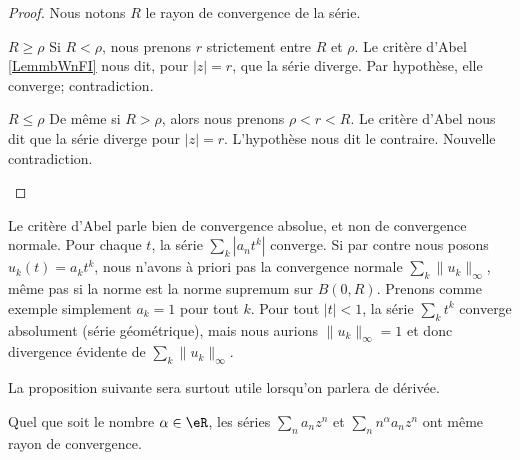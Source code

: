 \begin{proof}
	Nous notons \( R\) le rayon de convergence de la série.
	\begin{subproof}
		\item[\( R\geq \rho\)]
		Si \( R<\rho\), nous prenons \( r\) strictement entre \( R\) et \( \rho\). Le critère d'Abel \ref{LemmbWnFI} nous dit, pour \( | z |=r\), que la série diverge. Par hypothèse, elle converge; contradiction.
		\item[\( R\leq \rho\)]
		De même si \( R>\rho\), alors nous prenons \( \rho<r<R\). Le critère d'Abel nous dit que la série diverge pour \( | z |=r\). L'hypothèse nous dit le contraire. Nouvelle contradiction.
	\end{subproof}
\end{proof}

Le critère d'Abel parle bien de convergence absolue, et non de convergence normale. Pour chaque \( t\), la série \( \sum_k | a_nt^k |\) converge. Si par contre nous posons \( u_k(t)=a_kt^k\), nous n'avons à priori pas la convergence normale \( \sum_k\| u_k \|_{\infty}\), même pas si la norme est la norme supremum sur \( B(0,R)\). Prenons comme exemple simplement \( a_k=1\) pour tout \( k\). Pour tout \( | t |<1\), la série \( \sum_k t^k\) converge absolument (série géométrique), mais nous aurions \( \| u_k \|_{\infty}=1\) et donc divergence évidente de \( \sum_k\| u_k \|_{\infty}\).

La proposition suivante sera surtout utile lorsqu'on parlera de dérivée.
\begin{proposition}        \label{PropHDIUooKTbVSX}
	Quel que soit le nombre \( \alpha\in \eR\), les séries \( \sum_na_nz^n\) et \( \sum_nn^{\alpha}a_nz^n\) ont même rayon de convergence.
\end{proposition}

